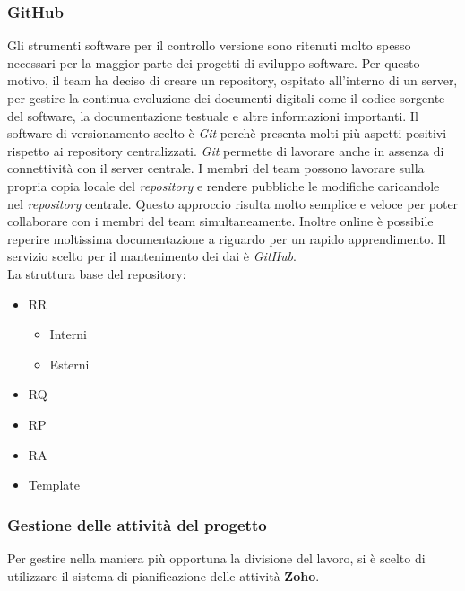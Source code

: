 \subsubsection{GitHub}
Gli strumenti software per il controllo versione sono ritenuti molto spesso necessari per la maggior parte dei progetti di sviluppo software.
Per questo motivo, il team ha deciso di creare un repository, ospitato all'interno di un server, per gestire la continua evoluzione dei documenti digitali come il codice sorgente del software, la documentazione testuale e altre informazioni importanti.
Il software di versionamento scelto è \textit{Git} perchè presenta molti più aspetti positivi rispetto ai repository centralizzati. \textit{Git} permette di lavorare anche in assenza di connettività con il server centrale. I membri del team possono lavorare sulla propria copia locale del \textit{repository} e rendere pubbliche le modifiche caricandole nel \textit{repository} centrale. Questo approccio risulta molto semplice e veloce per poter collaborare con i membri del team simultaneamente.
Inoltre online è possibile reperire moltissima documentazione a riguardo per un rapido apprendimento. Il servizio
scelto per il mantenimento dei dai è \textit{GitHub}. \\La struttura base del repository:
\begin{itemize}
  \item
	RR
	\begin{itemize}
		\item
			Interni
		\item
			Esterni
	\end{itemize}
  \item
    RQ
  \item
    RP
  \item
  	RA
  \item
  	Template 
\end{itemize} 

\subsubsection{Gestione delle attività del progetto}
Per gestire nella maniera più opportuna la divisione del lavoro, si è scelto di 
utilizzare il sistema di pianificazione delle attività \textbf{Zoho}.

